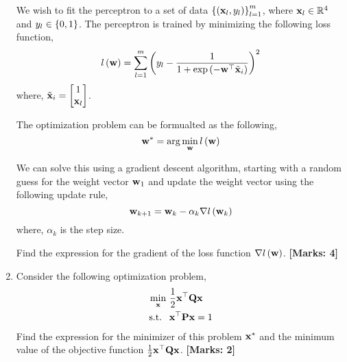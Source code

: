 \documentclass[12pt]{article}
\def\mf{\ensuremath\mathbf}
\def\mb{\ensuremath\mathbb}
\def\lp{\ensuremath\left(}
\def\rp{\ensuremath\right)}
\def\lc{\ensuremath\left\{}
\def\rc{\ensuremath\right\}}
\def\emx{\ensuremath\end{bmatrix*}}
\def\bmxc{\ensuremath\begin{bmatrix*}[c]}
\newcommand{\ct}[1]{\lp #1\rp}
\begin{document}
\begin{enumerate}
\begin{center}
    \end{center}

    We wish to fit the perceptron to a set of data $\lc\lp \mf{x}_l, y_l \rp\rc_{l=1}^{m}$, where $\mf{x}_l \in \mb{R}^4$ and $y_l \in \lc 0, 1\rc$. The perceptron is trained by minimizing the following loss function,
    \[ l\ct{\mf{w}} = \sum_{l=1}^{m} \lp y_l - \frac{1}{1 + \exp\ct{-\mf{w}^\top \tilde{\mf{x}}_i}}\rp^2 \]
    where, $\tilde{\mf{x}}_i = \bmxc 1 \\ \mf{x}_l\emx$.

    The optimization problem can be formualted as the following,
    \[ \mf{w}^* = \arg\min_{\mf{w}} l\ct{\mf{w}} \]

    We can solve this using a gradient descent algorithm, starting with a random guess for the weight vector $\mf{w}_1$ and update the weight vector using the following update rule,
    \[ \mf{w}_{k+1} = \mf{w}_k - \alpha_k \nabla l\ct{\mf{w}_k} \]
    where, $\alpha_k$ is the step size. 
    
    Find the expression for the gradient of the loss function $\nabla l\ct{\mf{w}}$. \textbf{[Marks: 4]}

    \item Consider the following optimization problem,
    \[  \begin{split}
        \min_{\mf{x}} &\,\, \frac{1}{2}\mf{x}^\top\mf{Q}\mf{x} \\
        \text{s.t. } &\,\, \mf{x}^\top\mf{P}\mf{x} = 1
       \end{split} \]
    Find the expression for the minimizer of this problem $\mf{x}^*$ and the minimum value of the objective function $\frac{1}{2}\mf{x}^\top\mf{Q}\mf{x}$. \textbf{[Marks: 2]}
       

\end{enumerate}
\end{document}

